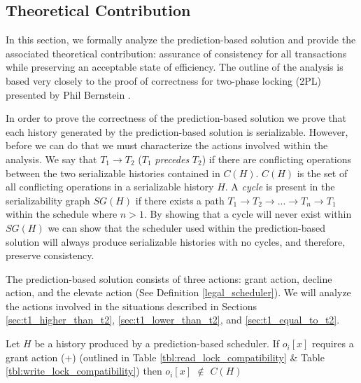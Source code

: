\subsection{Theoretical Contribution}
\label{pbs:theoretical_contribution}
In this section, we formally analyze the prediction-based solution and provide the associated theoretical contribution: assurance of consistency for all transactions while preserving an acceptable state of efficiency. The outline of the analysis is based very closely to the proof of correctness for two-phase locking (\ac{2PL}) presented by Phil Bernstein \cite[pp. 53-56]{Bernstein_1986:CCR:17299}. 

In order to prove the correctness of the prediction-based solution we prove that each history generated by the prediction-based solution is serializable. However, before we can do that we must characterize the actions involved within the analysis. We say that $T_{1} \rightarrow T_{2}$ ($T_{1}$ \textit{precedes} $T_{2}$) if there are conflicting operations between the two serializable histories contained in $C(H)$. $C(H)$ is the set of all conflicting operations in a serializable history $H$. A \textit{cycle} is present in the serializability graph $SG(H)$ if there exists a path $T_{1} \rightarrow T_{2} \rightarrow ... \rightarrow T_{n} \rightarrow T_{1}$ within the schedule where $n > 1$. By showing that a cycle will never exist within $SG(H)$ we can show that the scheduler used within the prediction-based solution will always produce serializable histories with no cycles, and therefore, preserve consistency.

The prediction-based solution consists of three actions: grant action, decline action, and the elevate action (See Definition \ref{legal_scheduler}). We will analyze the actions involved in the situations described in Sections \ref{sec:t1_higher_than_t2}, \ref{sec:t1_lower_than_t2}, and \ref{sec:t1_equal_to_t2}.

\begin{proposition}
\label{prop:grant}
Let $H$ be a history produced by a prediction-based scheduler. If $o_{i}[x]$ requires a grant action (+) (outlined in Table \ref{tbl:read_lock_compatibility} \& Table \ref{tbl:write_lock_compatibility}) then $o_{i}[x]$ $\notin$ $C(H)$
\end{proposition}

